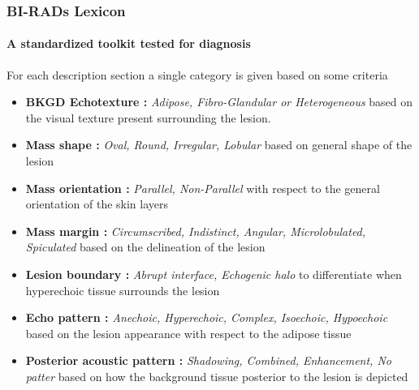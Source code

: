 \begin{frame}\frametitle{BI-RADs Lexicon}
  \framesubtitle{A standardized toolkit tested for diagnosis}
  \footnotesize
  For each description section a single category is given based on some criteria
  \begin{itemize}
    \item \textbf{BKGD Echotexture :}
      \textit{Adipose, Fibro-Glandular or Heterogeneous}
      based on the visual texture present surrounding the lesion.
    \item \textbf{Mass shape :}
      \textit{Oval, Round, Irregular, Lobular}
      based on general shape of the lesion
    \item \textbf{Mass orientation :}
      \textit{Parallel, Non-Parallel}
      with respect to the general orientation of the skin layers
    \item \textbf{Mass margin :}
      \textit{Circumscribed, Indistinct, Angular, Microlobulated, Spiculated}
      based on the delineation of the lesion
    \item \textbf{Lesion boundary :}
      \textit{Abrupt interface, Echogenic halo}
      to differentiate when hyperechoic tissue surrounds the lesion
    \item \textbf{Echo pattern :}
      \textit{Anechoic, Hyperechoic, Complex, Isoechoic, Hypoechoic}
      based on the lesion appearance with respect to the adipose tissue
    \item \textbf{Posterior acoustic pattern :}
      \textit{Shadowing, Combined, Enhancement, No patter}
      based on how the background tissue posterior to the lesion is depicted
  \end{itemize}
\end{frame}

